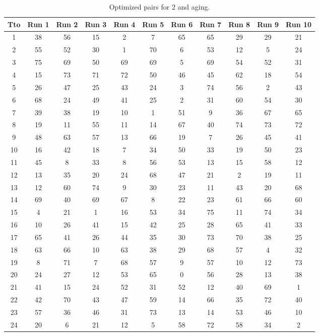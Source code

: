 \begin{table}
  \centering
  \scriptsize
  \caption{Optimized pairs for 2 and aging.}
  \label{tab_pairs}
\begin{tabular}{c c c c c c c c c c c }
\hline
Tto & Run 1 & Run 2 & Run 3 & Run 4 & Run 5 & Run 6 & Run 7 & Run 8 & Run 9 & Run 10 \\
\hline
1 & 38 & 56 & 15 & 2 & 7 & 65 & 65 & 29 & 29 & 21 \\
2 & 55 & 52 & 30 & 1 & 70 & 6 & 53 & 12 & 5 & 24 \\
3 & 75 & 69 & 50 & 69 & 69 & 5 & 69 & 54 & 52 & 31 \\
4 & 15 & 73 & 71 & 72 & 50 & 46 & 45 & 62 & 18 & 54 \\
5 & 26 & 47 & 25 & 43 & 24 & 3 & 74 & 56 & 2 & 43 \\
6 & 68 & 24 & 49 & 41 & 25 & 2 & 31 & 60 & 54 & 30 \\
7 & 39 & 38 & 19 & 10 & 1 & 51 & 9 & 36 & 67 & 65 \\
8 & 19 & 11 & 55 & 11 & 14 & 67 & 40 & 74 & 73 & 72 \\
9 & 48 & 63 & 57 & 13 & 66 & 19 & 7 & 26 & 45 & 41 \\
10 & 16 & 42 & 18 & 7 & 34 & 50 & 33 & 19 & 50 & 23 \\
11 & 45 & 8 & 33 & 8 & 56 & 53 & 13 & 15 & 58 & 12 \\
12 & 13 & 35 & 20 & 24 & 68 & 47 & 21 & 2 & 19 & 11 \\
13 & 12 & 60 & 74 & 9 & 30 & 23 & 11 & 43 & 20 & 68 \\
14 & 69 & 40 & 69 & 67 & 8 & 22 & 23 & 61 & 66 & 60 \\
15 & 4 & 21 & 1 & 16 & 53 & 34 & 75 & 11 & 74 & 34 \\
16 & 10 & 26 & 41 & 15 & 42 & 25 & 28 & 65 & 41 & 33 \\
17 & 65 & 41 & 26 & 44 & 35 & 30 & 73 & 70 & 38 & 25 \\
18 & 63 & 66 & 10 & 63 & 38 & 29 & 68 & 57 & 4 & 32 \\
19 & 8 & 71 & 7 & 68 & 57 & 9 & 57 & 10 & 12 & 73 \\
20 & 24 & 27 & 12 & 53 & 65 & 0 & 56 & 28 & 13 & 38 \\
21 & 41 & 15 & 24 & 52 & 31 & 52 & 12 & 40 & 69 & 1 \\
22 & 42 & 70 & 43 & 47 & 59 & 14 & 66 & 35 & 72 & 40 \\
23 & 57 & 36 & 46 & 31 & 73 & 13 & 14 & 53 & 46 & 10 \\
24 & 20 & 6 & 21 & 12 & 5 & 58 & 72 & 58 & 34 & 2 \\

\end{tabular}
\end{table}
